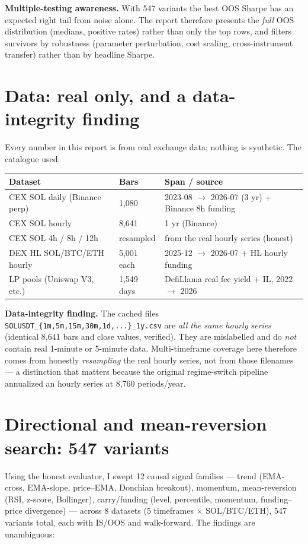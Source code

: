\documentclass[11pt,a4paper]{article}
\begin{document}
\textbf{Multiple-testing awareness.} With 547 variants the best OOS Sharpe has an expected right tail from noise alone. The report therefore presents the \emph{full} OOS distribution (medians, positive rates) rather than only the top rows, and filters survivors by robustness (parameter perturbation, cost scaling, cross-instrument transfer) rather than by headline Sharpe.

\section{Data: real only, and a data-integrity finding}

Every number in this report is from real exchange data; nothing is synthetic. The catalogue used:

\begin{center}
\begin{tabular}{lll}
\toprule
Dataset & Bars & Span / source \\
\midrule
CEX SOL daily (Binance perp) & 1,080 & 2023-08 $\to$ 2026-07 (3 yr) + Binance 8h funding \\
CEX SOL hourly & 8,641 & 1 yr (Binance) \\
CEX SOL 4h / 8h / 12h & resampled & from the real hourly series (honest) \\
DEX HL SOL/BTC/ETH hourly & 5,001 each & 2025-12 $\to$ 2026-07 + HL hourly funding \\
LP pools (Uniswap V3, etc.) & 1,549 days & DefiLlama real fee yield + IL, 2022 $\to$ 2026 \\
\bottomrule
\end{tabular}
\end{center}

\textbf{Data-integrity finding.} The cached files \texttt{SOLUSDT\_\{1m,5m,15m,30m,1d,...\}\_1y.csv} are \emph{all the same hourly series} (identical 8,641 bars and close values, verified). They are mislabelled and do \emph{not} contain real 1-minute or 5-minute data. Multi-timeframe coverage here therefore comes from honestly \emph{resampling} the real hourly series, not from those filenames --- a distinction that matters because the original regime-switch pipeline annualized an hourly series at 8{,}760 periods/year.

\section{Directional and mean-reversion search: 547 variants}

Using the honest evaluator, I swept 12 causal signal families --- trend (EMA-cross, EMA-slope, price--EMA, Donchian breakout), momentum, mean-reversion (RSI, z-score, Bollinger), carry/funding (level, percentile, momentum, funding--price divergence) --- across 8 datasets (5 timeframes $\times$ SOL/BTC/ETH), 547 variants total, each with IS/OOS and walk-forward. The findings are unambiguous:
\end{document}

